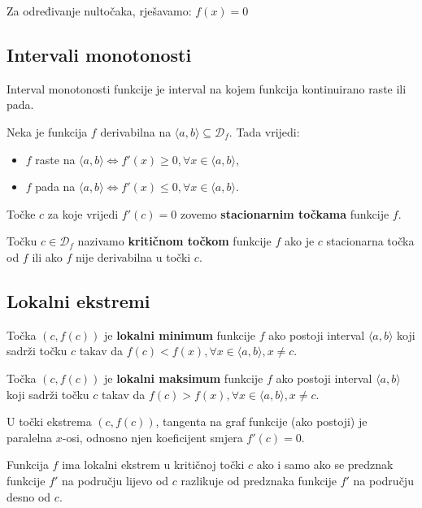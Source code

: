 Za određivanje nultočaka, rješavamo: $f(x) = 0$

\subsection{Intervali monotonosti}

Interval monotonosti funkcije je interval na kojem funkcija kontinuirano raste
ili pada.

\begin{theorem}
    Neka je funkcija $f$ derivabilna na $\langle a,b \rangle \subseteq \mathcal{D}_f$.
    Tada vrijedi:
    \begin{itemize}
        \item $f$ raste na $\langle a,b \rangle \Leftrightarrow f'(x) \geq 0, \forall x \in \langle a,b \rangle$,
        \item $f$ pada na $\langle a,b \rangle \Leftrightarrow f'(x) \leq 0, \forall x \in \langle a,b \rangle$.
    \end{itemize}
\end{theorem}

Točke $c$ za koje vrijedi $f'(c)=0$ zovemo \textbf{stacionarnim točkama}
funkcije $f$.

Točku $c\in \mathcal{D}_f$ nazivamo \textbf{kritičnom točkom} funkcije $f$ ako
je $c$ stacionarna točka od $f$ ili ako $f$ nije derivabilna u točki $c$.

\subsection{Lokalni ekstremi}

\begin{definition}
    Točka $(c, f(c))$ je \textbf{lokalni minimum} funkcije $f$ ako postoji
    interval $\langle a,b \rangle$ koji sadrži točku $c$ takav da
    $f(c)<f(x),\forall x \in \langle a,b \rangle, x\neq c$.

    Točka $(c, f(c))$ je \textbf{lokalni maksimum} funkcije $f$ ako postoji
    interval $\langle a,b \rangle$ koji sadrži točku $c$ takav da
    $f(c)>f(x),\forall x \in \langle a,b \rangle, x\neq c$.
\end{definition}

U točki ekstrema $(c, f(c))$, tangenta na graf funkcije (ako postoji) je
paralelna $x$-osi, odnosno njen koeficijent smjera $f'(c) = 0$.

Funkcija $f$ ima lokalni ekstrem u kritičnoj točki $c$ ako i samo ako se
predznak funkcije $f'$ na području lijevo od $c$ razlikuje od predznaka funkcije
$f'$ na području desno od $c$.

